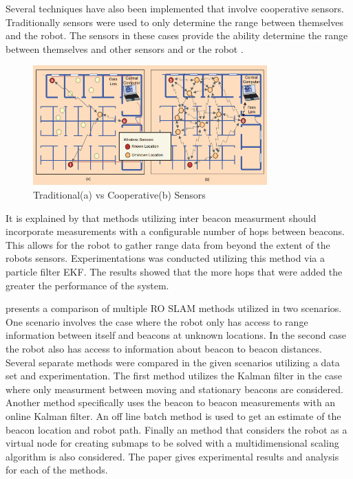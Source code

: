 \documentclass[conference]{IEEEtran}
\begin{document}
	
	
	Several techniques have also been implemented that involve cooperative sensors. Traditionally sensors were used to only determine the range between themselves and the robot. The sensors in these cases provide the ability determine the range between themselves and other sensors and or the robot \cite{Patwari2005}.
	
	\begin{figure}[h!]
		
		\centering
		
		\includegraphics[width=90mm]{coop_loc_comp_patwari.png}
		
		\caption{Traditional(a) vs Cooperative(b) Sensors \cite{Patwari2005}}
		
		\label{trad_vs_coop_sensors}
		
	\end{figure}
	
	\FloatBarrier
	
	
	
	It is explained by \cite{Torres-Gonzalez2015} that methods utilizing inter beacon measurment should incorporate measurements with a configurable number of hops between beacons. This allows for the robot to gather range data from beyond the extent of the robots sensors. Experimentations was conducted utilizing this method via a particle filter EKF. The results showed that the more hops that were added the greater the performance of the system. 
	
	
	
	\cite{Djugash2006} presents a comparison of multiple RO SLAM methods utilized in two scenarios. One scenario involves the case where the robot only has access to range information between itself and beacons at unknown locations. In the second case the robot also has access to information about beacon to beacon distances. Several separate methods were compared in the given scenarios utilizing a data set and experimentation. The first method utilizes the Kalman filter in the case where only measurment between moving and stationary beacons are considered. Another method specifically uses the beacon to beacon measurements with an online Kalman filter. An off line batch method is used to get an estimate of the beacon location and robot path. Finally an method that considers the robot as a virtual node for creating submaps to be solved with a multidimensional scaling algorithm is also considered. The paper gives experimental results and analysis for each of the methods. 
	
\end{document}
